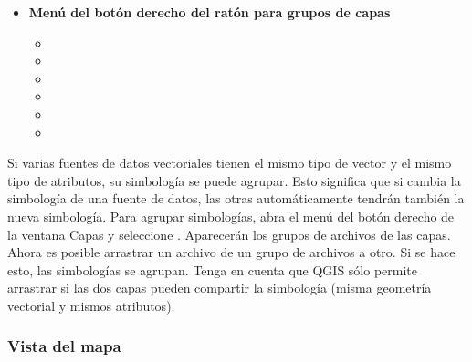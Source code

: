 \begin{itemize}
\item \textbf{Menú del botón derecho del ratón para grupos de capas} 
\begin{itemize}
\item {}
\item {}
\item {}
\item {}
\item {}
\item {}
\end{itemize}

\end{itemize}

Si varias fuentes de datos vectoriales tienen el mismo tipo de vector y el mismo tipo de atributos, su
simbología se puede agrupar. Esto significa que si cambia la simbología de una fuente de datos, 
las otras automáticamente tendrán también la nueva simbología. Para agrupar simbologías, abra 
el menú del botón derecho de la ventana Capas y seleccione . Aparecerán los 
grupos de archivos de las capas. Ahora es posible arrastrar un archivo de un grupo de archivos a otro. Si se hace esto, 
las simbologías se agrupan. Tenga en cuenta que QGIS sólo permite arrastrar si las dos capas pueden compartir
la simbología (misma geometría vectorial y mismos atributos). 

%

\subsubsection{Vista del mapa}\label{label_mapview}

